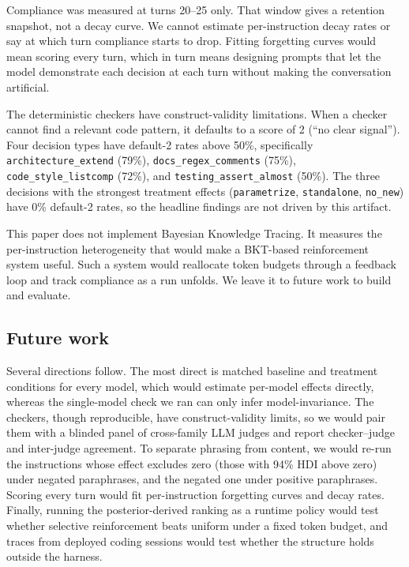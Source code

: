 \documentclass[a4paper]{llncs}
\begin{document}
Compliance was measured at turns 20--25 only. That window gives a retention
snapshot, not a decay curve. We cannot estimate per-instruction decay
rates or say at which turn compliance starts to drop. Fitting forgetting
curves would mean scoring every turn, which in turn means designing
prompts that let the model demonstrate each decision at each turn without
making the conversation artificial.

The deterministic checkers have construct-validity limitations. When a
checker cannot find a relevant code pattern, it defaults to a score of
2 (``no clear signal''). Four decision types have default-2 rates
above 50\%, specifically \texttt{architecture\_extend} (79\%),
\texttt{docs\_regex\_comments} (75\%), \texttt{code\_style\_listcomp}
(72\%), and \texttt{testing\_assert\_almost} (50\%). The three
decisions with the strongest treatment effects (\texttt{parametrize},
\texttt{standalone}, \texttt{no\_new}) have 0\% default-2 rates, so
the headline findings are not driven by this artifact.

This paper does not implement Bayesian Knowledge Tracing. It measures
the per-instruction heterogeneity that would make a BKT-based
reinforcement system useful. Such a system would reallocate token budgets through a feedback loop and
track compliance as a run unfolds. We leave it to future work to build
and evaluate.

\subsection{Future work}

Several directions follow. The most direct is matched baseline and
treatment conditions for every model, which would estimate per-model
effects directly, whereas the single-model check we ran can only infer
model-invariance. The checkers, though reproducible, have construct-validity limits,
so we would pair them with a blinded panel of cross-family LLM judges and
report checker--judge and inter-judge agreement. To separate phrasing from
content, we would re-run the instructions whose effect excludes zero
(those with 94\% HDI above zero) under negated paraphrases, and the negated
one under positive paraphrases.
Scoring every turn would fit per-instruction
forgetting curves and decay rates. Finally, running the posterior-derived
ranking as a runtime policy would test whether selective reinforcement
beats uniform under a fixed token budget, and traces from deployed
coding sessions would test whether the structure holds outside the harness.
\end{document}
